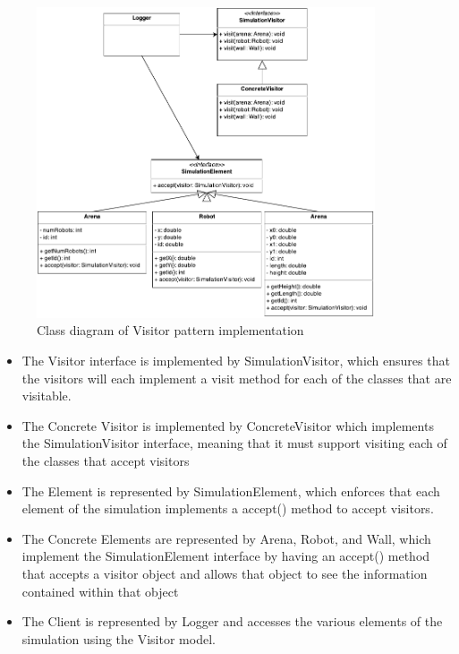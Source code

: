 \documentclass[11pt]{article}
\begin{document}
\begin{figure}[!htb]
  \begin{center}
    \includegraphics[width=100mm]{Visitor.pdf}
    \caption{Class diagram of Visitor pattern implementation}
    \label{fig:visitor}
  \end{center} 
\end{figure}

\begin{itemize}
\item The Visitor interface is implemented by {\ttfamily SimulationVisitor}, 
  which ensures that the visitors will each implement a visit method for each
  of the classes that are visitable. 
\item The Concrete Visitor is implemented by {\ttfamily ConcreteVisitor} which
  implements the {\ttfamily SimulationVisitor} interface, meaning that it must
  support visiting each of the classes that accept visitors
\item The Element is represented by {\ttfamily SimulationElement}, which 
  enforces that each element of the simulation implements a {\ttfamily accept()}
  method to accept visitors. 
\item The Concrete Elements are represented by {\ttfamily Arena}, 
  {\ttfamily Robot}, and {\ttfamily Wall}, which implement the 
  {\ttfamily SimulationElement} interface by having an {\ttfamily accept()} 
  method that accepts a visitor object and allows that object to see the 
  information contained within that object
\item The Client is represented by {\ttfamily Logger} and accesses the 
  various elements of the simulation using the Visitor model.
\end{itemize}
\end{document}
